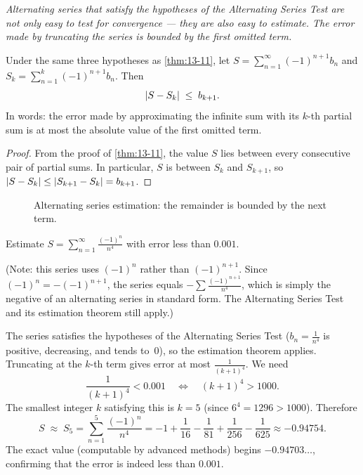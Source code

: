 \textit{Alternating series that satisfy the hypotheses of the Alternating Series Test are not only easy to test for convergence --- they are also easy to estimate.  The error made by truncating the series is bounded by the first omitted term.}

\begin{theorem}
\label{thm:13-12}
Under the same three hypotheses as \cref{thm:13-11}, let $S=\sum_{n=1}^{\infty}(-1)^{n+1}b_{n}$ and $S_{k}=\sum_{n=1}^{k}(-1)^{n+1}b_{n}$.  Then
\[
  \left\lvert S - S_{k} \right\rvert \;\le\; b_{k+1}.
\]
In words: the error made by approximating the infinite sum with its $k$-th partial sum is at most the absolute value of the first omitted term.
\end{theorem}

\begin{proof}
From the proof of \cref{thm:13-11}, the value $S$ lies between every consecutive pair of partial sums.  In particular, $S$ is between $S_{k}$ and $S_{k+1}$, so $\left\lvert S-S_{k} \right\rvert\le\left\lvert S_{k+1}-S_{k} \right\rvert=b_{k+1}$.
\end{proof}
\begin{figure}[ht]
  \centering
  
  \caption{Alternating series estimation: the remainder is bounded by the next term.}
  \label{fig:alternating-series-estimation}
\end{figure}
\begin{example}
\label{ex:13-12}
Estimate $\displaystyle S=\sum_{n=1}^{\infty}\frac{(-1)^{n}}{n^{4}}$ with error less than $0.001$.

(Note: this series uses $(-1)^{n}$ rather than $(-1)^{n+1}$.  Since $(-1)^{n}=-(-1)^{n+1}$, the series equals $-\sum\frac{(-1)^{n+1}}{n^{4}}$, which is simply the negative of an alternating series in standard form.  The Alternating Series Test and its estimation theorem still apply.)

The series satisfies the hypotheses of the Alternating Series Test ($b_{n}=\frac{1}{n^{4}}$ is positive, decreasing, and tends to~$0$), so the estimation theorem applies.  Truncating at the $k$-th term gives error at most $\frac{1}{(k+1)^{4}}$.  We need
\[
  \frac{1}{(k+1)^{4}} < 0.001 \quad\Longleftrightarrow\quad (k+1)^{4}>1000.
\]
The smallest integer $k$ satisfying this is $k=5$ (since $6^{4}=1296>1000$).  Therefore
\[
  S \;\approx\; S_{5} = \sum_{n=1}^{5}\frac{(-1)^{n}}{n^{4}} = -1+\frac{1}{16}-\frac{1}{81}+\frac{1}{256}-\frac{1}{625} \approx -0.94754.
\]
The exact value (computable by advanced methods) begins $-0.94703\ldots$, confirming that the error is indeed less than $0.001$.
\end{example}

